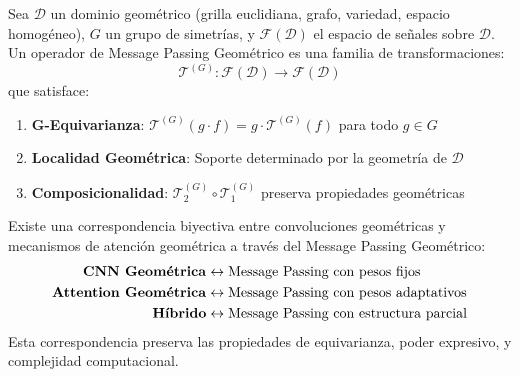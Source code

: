 \begin{definition}\label{def:message_passing_geometrico_generalizado}
Sea $\mathcal{D}$ un dominio geométrico (grilla euclidiana, grafo, variedad, espacio homogéneo), $G$ un grupo de simetrías, y $\mathcal{F}(\mathcal{D})$ el espacio de señales sobre $\mathcal{D}$. Un operador de Message Passing Geométrico es una familia de transformaciones:
\begin{equation}
    \mathcal{T}^{(G)}: \mathcal{F}(\mathcal{D}) \to \mathcal{F}(\mathcal{D})
    \label{eq:message_passing_geometrico_generalizado}
\end{equation}
que satisface:
\begin{enumerate}
    \item \textbf{G-Equivarianza}: $\mathcal{T}^{(G)}(g \cdot f) = g \cdot \mathcal{T}^{(G)}(f)$ para todo $g \in G$
    \item \textbf{Localidad Geométrica}: Soporte determinado por la geometría de $\mathcal{D}$
    \item \textbf{Composicionalidad}: $\mathcal{T}^{(G)}_2 \circ \mathcal{T}^{(G)}_1$ preserva propiedades geométricas
\end{enumerate}
\end{definition}

\begin{theorem}\label{thm:correspondencia_cnn_attention}
Existe una correspondencia biyectiva entre convoluciones geométricas y mecanismos de atención geométrica a través del Message Passing Geométrico:
\begin{align}
    \text{\textbf{CNN Geométrica}} &\leftrightarrow \text{Message Passing con pesos fijos} \\
    \text{\textbf{Attention Geométrica}} &\leftrightarrow \text{Message Passing con pesos adaptativos} \\
    \text{\textbf{Híbrido}} &\leftrightarrow \text{Message Passing con estructura parcial}
\end{align}
Esta correspondencia preserva las propiedades de equivarianza, poder expresivo, y complejidad computacional.
\end{theorem}

